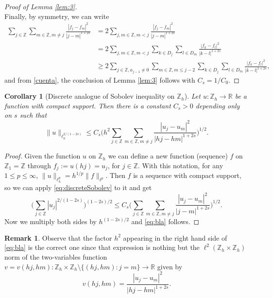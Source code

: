 \documentclass[a4paper,11pt,reqno]{amsart}
\newcommand{\R}{\mathbb{R}}
\newcommand{\Z}{\mathbb{Z}}
\newtheorem{cor}[thm]{Corollary}
\theoremstyle{definition}
\newtheorem{rem}[thm]{Remark}
\numberwithin{equation}{section}
\begin{document}
\begin{proof}[Proof of Lemma \ref{lem:3}]
\begin{equation}
\end{equation}
Finally, by symmetry, we can write
\begin{align*}
\sum_{j\in\Z}\sum_{m\in\Z,m\neq j}\frac{|f_j-f_m|^2}{|j-m|^{1+2s}} &= 2\sum_{j,m\in\Z,m<j}\frac{|f_j-f_m|^2}{|j-m|^{1+2s}} \\
&=2\sum_{j,m\in\Z,m<j}\sum_{k\in D_j}\sum_{l\in D_m}\frac{|f_k-f_l|^2}{|k-l|^{1+2s}} \\
&\geq 2\sum_{j\in\Z,a_{j-1}\neq0}\sum_{m\in\Z,m\leq j-2}\sum_{k\in D_j}\sum_{l\in D_m}\frac{|f_k-f_l|^2}{|k-l|^{1+2s}},
\end{align*}
and from \eqref{cuenta}, the conclusion of Lemma \ref{lem:3} follows with $C_s=1/C_0$.
\end{proof}

\begin{cor}[Discrete analogue of Sobolev inequality on $\Z_h$]\label{cor:h}
Let $u:\Z_h\to\R$ be a function with compact support. Then there is a constant $C_s>0$
depending only on $s$ such that
\begin{equation}
\label{eq:bla}
\|u\|_{\ell^{2/(1-2s)}_h}\leq C_s\bigg(h^2\sum_{j\in\Z}\sum_{m\in\Z,m\neq j}
\frac{|u_j-u_m|^2}{|hj-hm|^{1+2s}}\bigg)^{1/2}.
\end{equation}
\end{cor}

\begin{proof}
Given the function $u$ on $\Z_h$ we can define a new function (sequence) $f$
on $\Z_1=\Z$ through $f_j:=u(hj)=u_j$, for $j\in\Z$.
With this notation, for any $1\leq p\leq\infty$, $\|u\|_{\ell^p_h}=h^{1/p}\|f\|_{\ell^p}$.
Then $f$ is a sequence with compact support,
so we can apply \eqref{eq:discreteSobolev} to it and get
$$
\bigg(\sum_{j\in\Z}|u_j|^{2/(1-2s)}\bigg)^{(1-2s)/2} \leq
C_s\bigg(\sum_{j\in\Z}\sum_{m\in\Z,m\neq j} \frac{|u_j-u_m|^2}{|j-m|^{1+2s}}\bigg)^{1/2}.
$$
Now we multiply both sides by $h^{(1-2s)/2}$ and \eqref{eq:bla} follows.
\end{proof}

\begin{rem}
Observe that the factor $h^2$ appearing in the right hand side of \eqref{eq:bla} is the correct
one since that expression is nothing but the $\ell^2(\Z_h\times\Z_h)$ norm of the two-variables function
$v=v(hj,hm):\Z_h\times\Z_h\setminus\{(hj,hm):j=m\}\to\R$ given by
$$
v(hj,hm)=\frac{|u_j-u_m|^2}{|hj-hm|^{1+2s}}.
$$
\end{rem}
\end{document}
